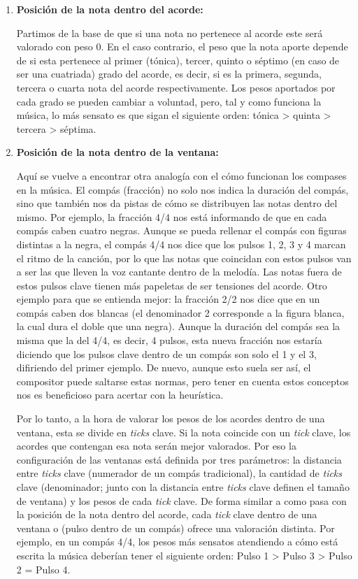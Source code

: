 \begin{enumerate}
    \item[\textbullet] \textbf{Posición de la nota dentro del acorde:}

    Partimos de la base de que si una nota no pertenece al acorde este será valorado con peso 0. En el caso contrario, el peso que la nota aporte depende de si esta pertenece al primer (tónica), tercer, quinto o  séptimo (en caso de ser una cuatriada) grado del acorde, es decir, si es la primera, segunda, tercera o cuarta nota del acorde respectivamente. Los pesos aportados por cada grado se pueden cambiar a voluntad, pero, tal y como funciona la música, lo más sensato es que sigan el siguiente orden: tónica > quinta > tercera > séptima. 
    
    \item[\textbullet] \textbf{Posición de la nota dentro de la ventana:}

    Aquí se vuelve a encontrar otra analogía con el cómo funcionan los compases en la música. El compás (fracción) no solo nos indica la duración del compás, sino que también nos da pistas de cómo se distribuyen las notas dentro del mismo. Por ejemplo, la fracción 4/4 nos está informando de que en cada compás caben cuatro negras. Aunque se pueda rellenar el compás con figuras distintas a la negra, el compás 4/4 nos dice que los pulsos 1, 2, 3 y 4 marcan el ritmo de la canción, por lo que las notas que coincidan con estos pulsos van a ser las que lleven la voz cantante dentro de la melodía. Las notas fuera de estos pulsos clave tienen más papeletas de ser tensiones del acorde. Otro ejemplo para que se entienda mejor: la fracción 2/2 nos dice que en un compás caben dos blancas (el denominador 2 corresponde a la figura blanca, la cual dura el doble que una negra). Aunque la duración del compás sea la misma que la del 4/4, es decir, 4 pulsos, esta nueva fracción nos estaría diciendo que los pulsos clave dentro de un compás son solo el 1 y el 3, difiriendo del primer ejemplo. De nuevo, aunque esto suela ser así, el compositor puede saltarse estas normas, pero tener en cuenta estos conceptos nos es beneficioso para acertar con la heurística.

    Por lo tanto, a la hora de valorar los pesos de los acordes dentro de una ventana, esta se divide en \textit{ticks} clave. Si la nota coincide con un \textit{tick} clave, los acordes que contengan esa nota serán mejor valorados. Por eso la configuración de las ventanas está definida por tres parámetros: la distancia entre \textit{ticks} clave (numerador de un compás tradicional), la cantidad de \textit{ticks} clave (denominador; junto con la distancia entre \textit{ticks} clave definen el tamaño de ventana) y los pesos de cada \textit{tick} clave. De forma similar a como pasa con la posición de la nota dentro del acorde, cada \textit{tick} clave dentro de una ventana o (pulso dentro de un compás) ofrece una valoración distinta. Por ejemplo, en un compás 4/4, los pesos más sensatos atendiendo a cómo está escrita la música deberían tener el siguiente orden: Pulso 1 > Pulso 3 > Pulso 2 = Pulso 4.


\end{enumerate}
